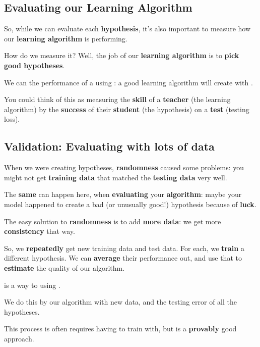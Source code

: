     \subsection{Evaluating our Learning Algorithm}
    
        So, while we can evaluate each \textbf{hypothesis}, it's also important to measure how our \textbf{learning algorithm} is performing.
        
        How do we measure it? Well, the job of our \textbf{learning algorithm} is to \textbf{pick good hypotheses}.\\
        
        \begin{concept}
            We can  the performance of a  using : a good learning algorithm will create  with .
        \end{concept}
        
        You could think of this as measuring the \textbf{skill} of a \textbf{teacher} (the learning algorithm) by the \textbf{success} of their \textbf{student} (the hypothesis) on a \textbf{test} (testing loss).
        
    \subsection{Validation: Evaluating with lots of data}
    
        When we were creating hypotheses, \textbf{randomness} caused some problems: you might not get \textbf{training data} that matched the \textbf{testing data} very well.
        
        The \textbf{same} can happen here, when \textbf{evaluating} your \textbf{algorithm}: maybe your model happened to create a bad (or unusually good!) hypothesis because of \textbf{luck}.
        
        The easy solution to \textbf{randomness} is to add \textbf{more data}: we get more \textbf{consistency} that way.
        
        So, we \textbf{repeatedly} get new training data and test data. For each, we \textbf{train} a different hypothesis. We can \textbf{average} their performance out, and use that to \textbf{estimate} the quality of our algorithm.\\
        
        \begin{definition}
             is a way to  using .
            
            We do this by  our algorithm  with new data, and  the testing error of all the hypotheses.
            
            This process is often requires having  to train with, but is a \textbf{provably} good approach.
        \end{definition}
        
